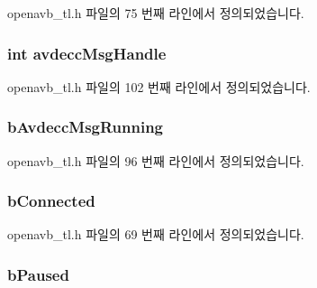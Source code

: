 openavb\+\_\+tl.\+h 파일의 75 번째 라인에서 정의되었습니다.

\subsubsection[{\texorpdfstring{avdecc\+Msg\+Handle}{avdeccMsgHandle}}]{\setlength{\rightskip}{0pt plus 5cm}int avdecc\+Msg\+Handle}\hypertarget{structtl__state__t_a0ec8286c7813affa4fbe99bc5ce31f5a}{}\label{structtl__state__t_a0ec8286c7813affa4fbe99bc5ce31f5a}


openavb\+\_\+tl.\+h 파일의 102 번째 라인에서 정의되었습니다.

\subsubsection[{\texorpdfstring{b\+Avdecc\+Msg\+Running}{bAvdeccMsgRunning}}]{ b\+Avdecc\+Msg\+Running}\hypertarget{structtl__state__t_a8895d65375bebc7824af406834f9a4fd}{}\label{structtl__state__t_a8895d65375bebc7824af406834f9a4fd}


openavb\+\_\+tl.\+h 파일의 96 번째 라인에서 정의되었습니다.

\subsubsection[{\texorpdfstring{b\+Connected}{bConnected}}]{ b\+Connected}\hypertarget{structtl__state__t_a27fec7db63617379ec20651b83d27fc7}{}\label{structtl__state__t_a27fec7db63617379ec20651b83d27fc7}


openavb\+\_\+tl.\+h 파일의 69 번째 라인에서 정의되었습니다.

\subsubsection[{\texorpdfstring{b\+Paused}{bPaused}}]{ b\+Paused}\hypertarget{structtl__state__t_a482f6ada6075613ca714da569f763e90}{}\label{structtl__state__t_a482f6ada6075613ca714da569f763e90}


